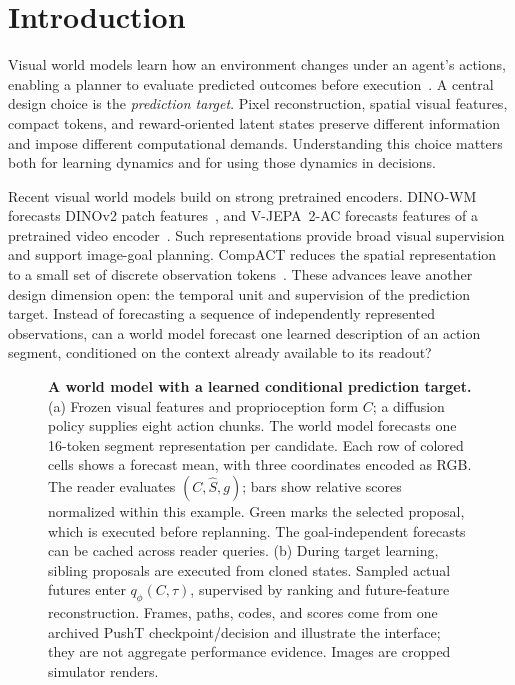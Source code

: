 \section{Introduction}
\label{sec:intro}
Visual world models learn how an environment changes under an agent's actions, enabling a planner to evaluate predicted outcomes before execution~\cite{hafner2019planet,zhou2025dinowm,assran2025vjepa2}. A central design choice is the \emph{prediction target}. Pixel reconstruction, spatial visual features, compact tokens, and reward-oriented latent states preserve different information and impose different computational demands. Understanding this choice matters both for learning dynamics and for using those dynamics in decisions.

Recent visual world models build on strong pretrained encoders. DINO-WM forecasts DINOv2 patch features~\cite{zhou2025dinowm,oquab2024dinov2}, and V-JEPA~2-AC forecasts features of a pretrained video encoder~\cite{assran2025vjepa2}. Such representations provide broad visual supervision and support image-goal planning. CompACT reduces the spatial representation to a small set of discrete observation tokens~\cite{kim2026compact}. These advances leave another design dimension open: the temporal unit and supervision of the prediction target. Instead of forecasting a sequence of independently represented observations, can a world model forecast one learned description of an action segment, conditioned on the context already available to its readout?

\begin{figure}[t]
\centering

\caption{\textbf{A world model with a learned conditional prediction target.} (a) Frozen visual features and proprioception form $C$; a diffusion policy supplies eight action chunks. The world model forecasts one 16-token segment representation per candidate. Each row of colored cells shows a forecast mean, with three coordinates encoded as RGB. The reader evaluates $(C,\hat S,g)$; bars show relative scores normalized within this example. Green marks the selected proposal, which is executed before replanning. The goal-independent forecasts can be cached across reader queries. (b) During target learning, sibling proposals are executed from cloned states. Sampled actual futures enter $q_\phi(C,\tau)$, supervised by ranking and future-feature reconstruction. Frames, paths, codes, and scores come from one archived PushT checkpoint/decision and illustrate the interface; they are not aggregate performance evidence. Images are cropped simulator renders.}
\label{fig:overview}
\end{figure}

